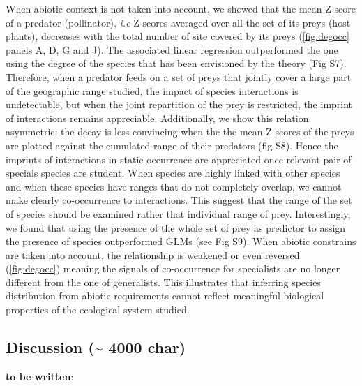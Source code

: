 When abiotic context is not taken into account, we showed that the mean
Z-score of a predator (pollinator), \emph{i.e} Z-scores averaged over
all the set of its preys (host plants), decreases with the total number
of site covered by its preys (\ref{fig:degocc} panels A, D, G and J).
The associated linear regression outperformed the one using the degree
of the species that has been envisioned by the theory (Fig S7).
Therefore, when a predator feeds on a set of preys that jointly cover a
large part of the geographic range studied, the impact of species
interactions is undetectable, but when the joint repartition of the prey
is restricted, the imprint of interactions remains appreciable.
Additionally, we show this relation asymmetric: the decay is less
convincing when the the mean Z-scores of the preys are plotted against
the cumulated range of their predators (fig S8). Hence the imprints of
interactions in static occurrence are appreciated once relevant pair of
specials species are student. When species are highly linked with other
species and when these species have ranges that do not completely
overlap, we cannot make clearly co-occurrence to interactions. This
suggest that the range of the set of species should be examined rather
that individual range of prey. Interestingly, we found that using the
presence of the whole set of prey as predictor to assign the presence of
species outperformed GLMs (see Fig S9). When abiotic constrains are
taken into account, the relationship is weakened or even reversed
(\ref{fig:degocc}) meaning the signals of co-occurrence for specialists
are no longer different from the one of generalists. This illustrates
that inferring species distribution from abiotic requirements cannot
reflect meaningful biological properties of the ecological system
studied.

\subsection{Discussion (\textasciitilde{} 4000
char)}\label{discussion-4000-char}

\textbf{to be written}:

